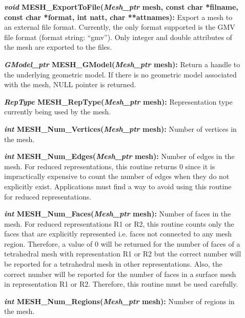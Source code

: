 \documentclass[12pt]{article}
\begin{document}
\begin{description}
\item[]\textbf{\textit{void} MESH\_ExportToFile(\textit{Mesh\_ptr}
    mesh, const char *filname, const char *format, int natt, char
    **attnames):} Export a mesh to an external file format. Currently,
  the only format supported is the GMV file format (format string:
  ``gmv''). Only integer and double attributes of the mesh are
  exported to the files.

\item[]

\item[]\textbf{\textit{GModel\_ptr} MESH\_GModel(\textit{Mesh\_ptr} mesh):}
Return a handle to the underlying geometric model. If there is no
geometric model associated with the mesh, NULL pointer is returned.

\item[]\textbf{\textit{RepType} MESH\_RepType(\textit{Mesh\_ptr} mesh):}
Representation type currently being used by the mesh.

\item[]

\item[]\textbf{\textit{int} MESH\_Num\_Vertices(\textit{Mesh\_ptr} mesh):}
Number of vertices in the mesh.

\item[]\textbf{\textit{int} MESH\_Num\_Edges(\textit{Mesh\_ptr} mesh):}
Number of edges in the mesh. For reduced representations, this routine
returns 0 since it is impractically expensive to count the number of
edges when they do not explicitly exist. Applications must find a way
to avoid using this routine for reduced representations.

\item[]\textbf{\textit{int} MESH\_Num\_Faces(\textit{Mesh\_ptr} mesh):}
Number of faces in the mesh. For reduced representations R1 or R2,
this routine counts only the faces that are explicitly represented
i.e. faces not connected to any mesh region. Therefore, a value of 0
will be returned for the number of faces of a tetrahedral mesh with
representation R1 or R2 but the correct number will be reported for a
tetrahedral mesh in other representations. Also, the correct number
will be reported for the number of faces in a surface mesh in
representation R1 or R2.  Therefore, this routine must be used
carefully.


\item[]\textbf{\textit{int} MESH\_Num\_Regions(\textit{Mesh\_ptr} mesh):}
Number of regions in the mesh.


\end{description}
\end{document}
